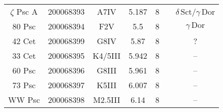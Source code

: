 \begin{table*}
\begin{tabular}{ccccccc}
$\zeta$ Psc A & 200068393 & A7IV & 5.187 & 8 &  & $\delta\,\text{Sct}$/$\gamma\,\text{Dor}$ \\
80 Psc & 200068394 & F2V & 5.5 & 8 &  & $\gamma\,\text{Dor}$ \\
42 Cet & 200068399 & G8IV & 5.87 & 8 &  & ? \\
33 Cet & 200068395 & K4/5III & 5.942 & 8 &  & -- \\
60 Psc & 200068396 & G8III & 5.961 & 8 &  & -- \\
73 Psc & 200068397 & K5III & 6.007 & 8 &  & -- \\
WW Psc & 200068398 & M2.5III & 6.14 & 8 &  & -- \\
\hline
\end{tabular}
\end{table*}
